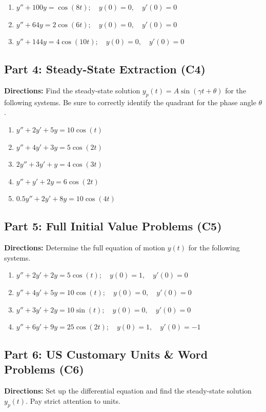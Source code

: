 \documentclass[11pt]{article}
\begin{document}
\begin{enumerate}[label=\textbf{\arabic*.}, resume]
    \item $y'' + 100y = \cos(8t); \quad y(0) = 0, \quad y'(0) = 0$
    \item $y'' + 64y = 2\cos(6t); \quad y(0) = 0, \quad y'(0) = 0$
    \item $y'' + 144y = 4\cos(10t); \quad y(0) = 0, \quad y'(0) = 0$
\end{enumerate}

\subsection*{Part 4: Steady-State Extraction (C4)}
\noindent \textbf{Directions:} Find the steady-state solution $y_p(t) = A \sin(\gamma t + \theta)$ for the following systems. Be sure to correctly identify the quadrant for the phase angle $\theta$.

\begin{enumerate}[label=\textbf{\arabic*.}, resume]
    \item $y'' + 2y' + 5y = 10 \cos(t)$
    \item $y'' + 4y' + 3y = 5 \cos(2t)$
    \item $2y'' + 3y' + y = 4 \cos(3t)$
    \item $y'' + y' + 2y = 6 \cos(2t)$
    \item $0.5y'' + 2y' + 8y = 10 \cos(4t)$
\end{enumerate}

\subsection*{Part 5: Full Initial Value Problems (C5)}
\noindent \textbf{Directions:} Determine the full equation of motion $y(t)$ for the following systems.

\begin{enumerate}[label=\textbf{\arabic*.}, resume]
    \item $y'' + 2y' + 2y = 5 \cos(t); \quad y(0) = 1, \quad y'(0) = 0$
    \item $y'' + 4y' + 5y = 10 \cos(t); \quad y(0) = 0, \quad y'(0) = 0$
    \item $y'' + 3y' + 2y = 10 \sin(t); \quad y(0) = 0, \quad y'(0) = 0$
    \item $y'' + 6y' + 9y = 25 \cos(2t); \quad y(0) = 1, \quad y'(0) = -1$
\end{enumerate}

\subsection*{Part 6: US Customary Units \& Word Problems (C6)}
\noindent \textbf{Directions:} Set up the differential equation and find the steady-state solution $y_p(t)$. Pay strict attention to units.
\end{document}
